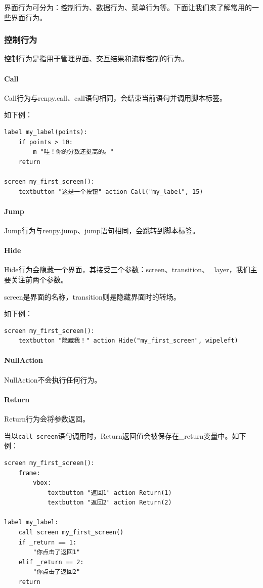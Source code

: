 \documentclass[../../Main.tex]{subfiles}
\begin{document}
界面行为可分为：控制行为、数据行为、菜单行为等。下面让我们来了解常用的一些界面行为。

\subsubsection{控制行为}
控制行为是指用于管理界面、交互结果和流程控制的行为。
\paragraph{Call}
Call行为与renpy.call、call语句相同，会结束当前语句并调用脚本标签。

如下例：
\begin{lstlisting}
label my_label(points):
    if points > 10:
        m "哇！你的分数还挺高的。"
    return

screen my_first_screen():
    textbutton "这是一个按钮" action Call("my_label", 15)
\end{lstlisting}

\paragraph{Jump}
Jump行为与renpy.jump、jump语句相同，会跳转到脚本标签。

\paragraph{Hide}
Hide行为会隐藏一个界面，其接受三个参数：screen、transition、\_layer，我们主要关注前两个参数。

screen是界面的名称，transition则是隐藏界面时的转场。

如下例：
\begin{lstlisting}
screen my_first_screen():
    textbutton "隐藏我！" action Hide("my_first_screen", wipeleft)
\end{lstlisting}

\paragraph{NullAction}
NullAction不会执行任何行为。

\paragraph{Return}
Return行为会将参数返回。

当以\verb|call screen|语句调用时，Return返回值会被保存在\_return变量中。如下例：
\begin{lstlisting}
screen my_first_screen():
    frame:
        vbox:
            textbutton "返回1" action Return(1)
            textbutton "返回2" action Return(2)

label my_label:
    call screen my_first_screen()
    if _return == 1:
        "你点击了返回1"
    elif _return == 2:
        "你点击了返回2"
    return
\end{lstlisting}
\end{document}
